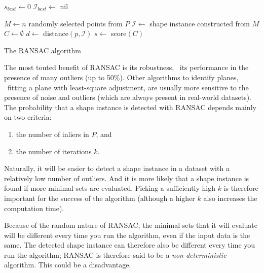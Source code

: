 \begin{algorithm}
	$s_{best} \leftarrow 0$\;
	$\mathcal{I}_{best} \leftarrow$ nil\;

	{
		$M \leftarrow n$ randomly selected points from $P$\;
		$\mathcal{I} \leftarrow$ shape instance constructed from $M$\;
		$C \leftarrow \emptyset$ \;
		{
			$d \leftarrow$ distance$(p,\mathcal{I})$\;
		}
		$s \leftarrow$ score$(C)$\;
	}
	\caption{The RANSAC algorithm}
	\label{algo:ransac}
\end{algorithm}




The most touted benefit of RANSAC is its robustness, \ie\ its performance in the presence of many outliers (up to 50\%). 
Other algorithms to identify planes, \eg\ fitting a plane with least-square adjustment, are usually more sensitive to the presence of noise and outliers (which are always present in real-world datasets).
The probability that a shape instance is detected with RANSAC depends mainly on two criteria:
\begin{enumerate}
	\item the number of inliers in $P$, and
	\item the number of iterations $k$.
\end{enumerate}
Naturally, it will be easier to detect a shape instance in a dataset with a relatively low number of outliers.
And it is more likely that a shape instance is found if more minimal sets are evaluated.
Picking a sufficiently high $k$ is therefore important for the success of the algorithm (although a higher $k$ also increases the computation time).

Because of the random nature of RANSAC, the minimal sets that it will evaluate will be different every time you run the algorithm, even if the input data is the same.
The detected shape instance can therefore also be different every time you run the algorithm; RANSAC is therefore said to be a \emph{non-deterministic} algorithm.
This could be a disadvantage.

